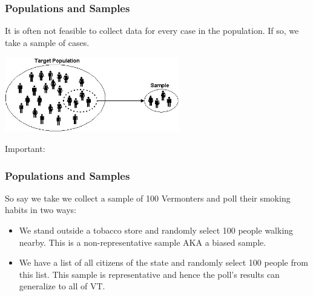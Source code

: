 \documentclass[handout]{beamer}
\newcommand{\blue}[1]{\textcolor{blue2}{#1}}
\begin{document}
\begin{frame}
\frametitle{Populations and Samples}

It is often not feasible to collect data for every case in the population.  If so, we take a \blue{sample} of cases.

\begin{center}
\pause\includegraphics[width=3in]{./figure/target-population.jpg} 
\end{center}

\pause 

Important:
%
%

\end{frame}


\begin{frame}
\frametitle{Populations and Samples}
So say we take we collect a sample of 100 Vermonters and poll their smoking habits in two ways:

\begin{itemize}
\pause\item We stand outside a tobacco store and randomly select 100 people walking nearby.  This is a non-representative sample AKA a \blue{biased sample}.
\pause\item We have a list of all citizens of the state and randomly select 100 people from this list.  This sample is representative and hence the poll's results can generalize to all of VT.  
\end{itemize}

\end{frame}
\end{document}
